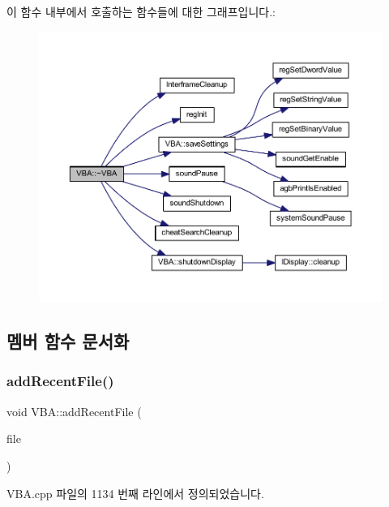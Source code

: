 이 함수 내부에서 호출하는 함수들에 대한 그래프입니다.\+:
\nopagebreak
\begin{figure}[H]
\begin{center}
\leavevmode
\includegraphics[width=350pt]{class_v_b_a_a601b4d3c159fde6e6232749e47af58b1_cgraph}
\end{center}
\end{figure}


\subsection{멤버 함수 문서화}
\mbox{\label{class_v_b_a_a6b68e58bd0ae7a246ca3c1cd66a1c9db}} 
\subsubsection{\texorpdfstring{add\+Recent\+File()}{addRecentFile()}}
{\footnotesize\ttfamily void V\+B\+A\+::add\+Recent\+File (\begin{DoxyParamCaption}\item[{C\+String}]{file }\end{DoxyParamCaption})}



V\+B\+A.\+cpp 파일의 1134 번째 라인에서 정의되었습니다.


